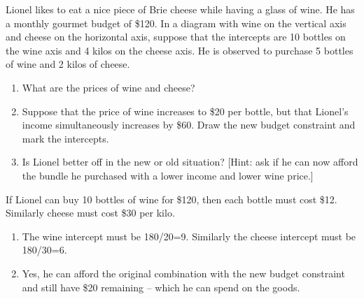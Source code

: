 \begin{enumialphparenastyle}
\begin{ex}\label{ex:ch6ex9}
Lionel likes to eat a nice piece of Brie cheese while having a glass of wine. He has a monthly gourmet budget of \$120. In a diagram with wine on the vertical axis and cheese on the horizontal axis, suppose that the intercepts are 10 bottles on the wine axis and 4 kilos on the cheese axis. He is observed to purchase 5 bottles of wine and 2 kilos of cheese.
\begin{enumerate}
	\item	What are the prices of wine and cheese?
	\item	Suppose that the price of wine increases to \$20 per bottle, but that Lionel's income simultaneously increases by \$60. Draw the new budget constraint and mark the intercepts.
	\item	Is Lionel better off in the new or old situation? [Hint: ask if he can now afford the bundle he purchased with a lower income and lower wine price.]
\end{enumerate}
\begin{sol}
	If Lionel can buy 10 bottles of wine for \$120, then each bottle must cost \$12. Similarly cheese must cost \$30 per kilo.
	\begin{enumerate}
		\item	The wine intercept must be 180/20=9. Similarly the cheese intercept must be 180/30=6.
		\item	Yes, he can afford the original combination with the new budget constraint and still have \$20 remaining -- which he can spend on the goods.
	\end{enumerate}
\end{sol}
\end{ex}


\end{enumialphparenastyle}
